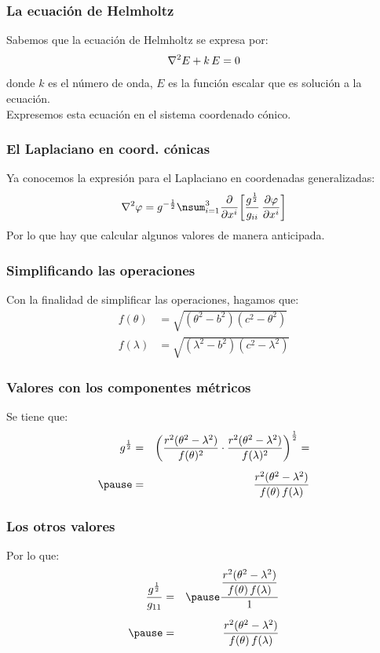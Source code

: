 \documentclass[12pt]{beamer}
\begin{document}
\begin{frame}
\frametitle{La ecuación de Helmholtz}
Sabemos que la ecuación de Helmholtz se expresa por:
\pause
\begin{align*}
\laplacian{E} + k \, E = 0
\end{align*}
donde $k$ es el número de onda, $E$ es la función escalar que es solución a la ecuación.
\\
\bigskip
\pause
Expresemos esta ecuación en el sistema coordenado cónico.
\end{frame}
\begin{frame}
\frametitle{El Laplaciano en coord. cónicas}
Ya conocemos la expresión para el Laplaciano en coordenadas generalizadas:
\begin{align*}
\laplacian{\varphi} = g^{-\frac{1}{2}} \nsum_{i=1}^{3} \pdv{x^{i}} \bigg[ \dfrac{g^{\frac{1}{2}}}{g_{ii}} \, \pdv{\varphi}{x^{i}}\bigg]
  \end{align*}
\pause
Por lo que hay que calcular algunos valores de manera anticipada.  
\end{frame}
\begin{frame}
\frametitle{Simplificando las operaciones}
Con la finalidad de simplificar las operaciones, hagamos que:
\pause
\begin{align*}
f(\theta) &= \sqrt{(\theta^{2} - b^{2})(c^{2} - \theta^{2})} \\[0.5em]
f(\lambda) &= \sqrt{(\lambda^{2} - b^{2})(c^{2} - \lambda^{2})}
\end{align*}
\end{frame}
\begin{frame}
\frametitle{Valores con los componentes métricos}
Se tiene que:
\pause
\begin{eqnarray*}
g^{\frac{1}{2}} &=& \left( \dfrac{r^{2} (\theta^{2} - \lambda^{2})}{f(\theta)^{2}} \cdot \dfrac{r^{2} (\theta^{2} - \lambda^{2})}{f(\lambda)^{2}} \right)^{\frac{1}{2}} = \\[0.5em] \pause
&=& \dfrac{r^{2} (\theta^{2} - \lambda^{2})}{f(\theta) \, f(\lambda)}
\end{eqnarray*}
\end{frame}
\begin{frame}
\frametitle{Los otros valores}
Por lo que:
\begin{eqnarray*}
\dfrac{g^{\frac{1}{2}}}{g_{11}} &=& \pause \dfrac{\dfrac{r^{2}(\theta^{2} - \lambda^{2})}{f(\theta) \, f(\lambda)}}{1} \\[0.5em] \pause
&=& \dfrac{r^{2}(\theta^{2} - \lambda^{2})}{f(\theta) \, f(\lambda)}
\end{eqnarray*}
\end{frame}
\end{document}
